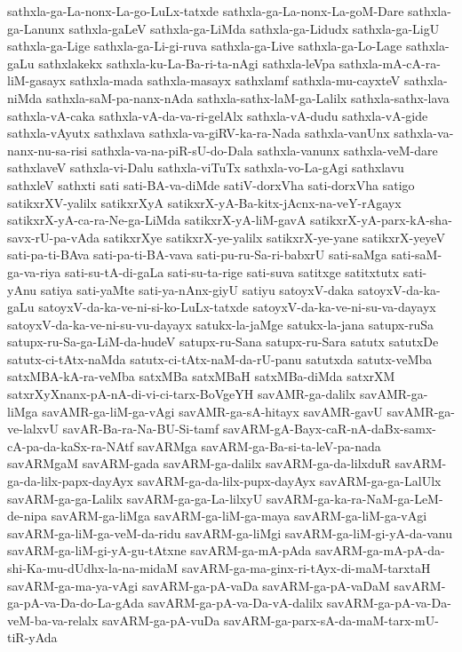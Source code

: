 {sathxla-ga-La-nonx-La-go-LuLx-tatxde
sathxla-ga-La-nonx-La-goM-Dare
sathxla-ga-Lanunx
sathxla-gaLeV
sathxla-ga-LiMda
sathxla-ga-Lidudx
sathxla-ga-LigU
sathxla-ga-Lige
sathxla-ga-Li-gi-ruva
sathxla-ga-Live
sathxla-ga-Lo-Lage
sathxla-gaLu
sathxlakekx
sathxla-ku-La-Ba-ri-ta-nAgi
sathxla-leVpa
sathxla-mA-cA-ra-liM-gasayx
sathxla-mada
sathxla-masayx
sathxlamf
sathxla-mu-cayxteV
sathxla-niMda
sathxla-saM-pa-nanx-nAda
sathxla-sathx-laM-ga-Lalilx
sathxla-sathx-lava
sathxla-vA-caka
sathxla-vA-da-va-ri-gelAlx
sathxla-vA-dudu
sathxla-vA-gide
sathxla-vAyutx
sathxlava
sathxla-va-giRV-ka-ra-Nada
sathxla-vanUnx
sathxla-va-nanx-nu-sa-risi
sathxla-va-na-piR-sU-do-Dala
sathxla-vanunx
sathxla-veM-dare
sathxlaveV
sathxla-vi-Dalu
sathxla-viTuTx
sathxla-vo-La-gAgi
sathxlavu
sathxleV
sathxti
sati
sati-BA-va-diMde
satiV-dorxVha
sati-dorxVha
satigo
satikxrXV-yalilx
satikxrXyA
satikxrX-yA-Ba-kitx-jAcnx-na-veY-rAgayx
satikxrX-yA-ca-ra-Ne-ga-LiMda
satikxrX-yA-liM-gavA
satikxrX-yA-parx-kA-sha-savx-rU-pa-vAda
satikxrXye
satikxrX-ye-yalilx
satikxrX-ye-yane
satikxrX-yeyeV
sati-pa-ti-BAva
sati-pa-ti-BA-vava
sati-pu-ru-Sa-ri-babxrU
sati-saMga
sati-saM-ga-va-riya
sati-su-tA-di-gaLa
sati-su-ta-rige
sati-suva
satitxge
satitxtutx
sati-yAnu
satiya
sati-yaMte
sati-ya-nAnx-giyU
satiyu
satoyxV-daka
satoyxV-da-ka-gaLu
satoyxV-da-ka-ve-ni-si-ko-LuLx-tatxde
satoyxV-da-ka-ve-ni-su-va-dayayx
satoyxV-da-ka-ve-ni-su-vu-dayayx
satukx-la-jaMge
satukx-la-jana
satupx-ruSa
satupx-ru-Sa-ga-LiM-da-hudeV
satupx-ru-Sana
satupx-ru-Sara
satutx
satutxDe
satutx-ci-tAtx-naMda
satutx-ci-tAtx-naM-da-rU-panu
satutxda
satutx-veMba
satxMBA-kA-ra-veMba
satxMBa
satxMBaH
satxMBa-diMda
satxrXM
satxrXyXnanx-pA-nA-di-vi-ci-tarx-BoVgeYH
savAMR-ga-dalilx
savAMR-ga-liMga
savAMR-ga-liM-ga-vAgi
savAMR-ga-sA-hitayx
savAMR-gavU
savAMR-ga-ve-lalxvU
savAR-Ba-ra-Na-BU-Si-tamf
savARM-gA-Bayx-caR-nA-daBx-samx-cA-pa-da-kaSx-ra-NAtf
savARMga
savARM-ga-Ba-si-ta-leV-pa-nada
savARMgaM
savARM-gada
savARM-ga-dalilx
savARM-ga-da-lilxduR
savARM-ga-da-lilx-papx-dayAyx
savARM-ga-da-lilx-pupx-dayAyx
savARM-ga-ga-LalUlx
savARM-ga-ga-Lalilx
savARM-ga-ga-La-lilxyU
savARM-ga-ka-ra-NaM-ga-LeM-de-nipa
savARM-ga-liMga
savARM-ga-liM-ga-maya
savARM-ga-liM-ga-vAgi
savARM-ga-liM-ga-veM-da-ridu
savARM-ga-liMgi
savARM-ga-liM-gi-yA-da-vanu
savARM-ga-liM-gi-yA-gu-tAtxne
savARM-ga-mA-pAda
savARM-ga-mA-pA-da-shi-Ka-mu-dUdhx-la-na-midaM
savARM-ga-ma-ginx-ri-tAyx-di-maM-tarxtaH
savARM-ga-ma-ya-vAgi
savARM-ga-pA-vaDa
savARM-ga-pA-vaDaM
savARM-ga-pA-va-Da-do-La-gAda
savARM-ga-pA-va-Da-vA-dalilx
savARM-ga-pA-va-Da-veM-ba-va-relalx
savARM-ga-pA-vuDa
savARM-ga-parx-sA-da-maM-tarx-mU-tiR-yAda
}
